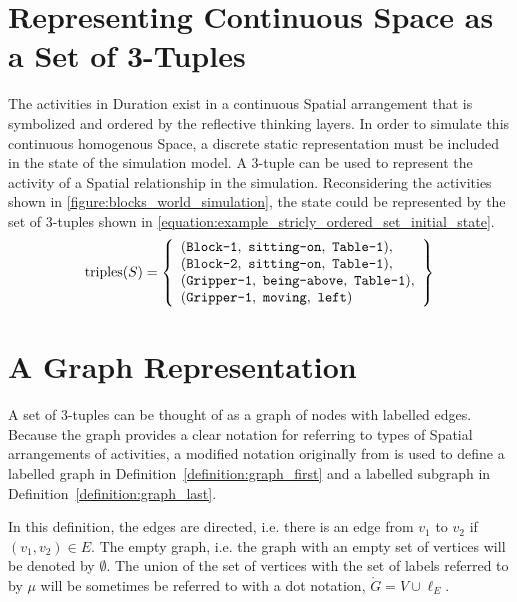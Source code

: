 \section{Representing Continuous Space as a Set of 3-Tuples}

The activities in Duration exist in a continuous Spatial arrangement
that is symbolized and ordered by the reflective thinking layers.  In
order to simulate this continuous homogenous Space, a discrete static
representation must be included in the state of the simulation model.
A 3-tuple can be used to represent the activity of a Spatial
relationship in the simulation.  Reconsidering the activities shown in
{\mbox{\autoref{figure:blocks_world_simulation}}}, the state could be
represented by the set of 3-tuples shown in
{\mbox{\autoref{equation:example_stricly_ordered_set_initial_state}}}.
\begin{equation}
\label{equation:example_stricly_ordered_set_initial_state}
\text{triples}(S) =
  \left\{
    \begin{array}{l}
      (\text{\tt{Block-1}},   ~\text{\tt{sitting-on}},  ~\text{\tt{Table-1}}), \\
      (\text{\tt{Block-2}},   ~\text{\tt{sitting-on}},  ~\text{\tt{Table-1}}), \\
      (\text{\tt{Gripper-1}}, ~\text{\tt{being-above}}, ~\text{\tt{Table-1}}), \\
      (\text{\tt{Gripper-1}}, ~\text{\tt{moving}},      ~\text{\tt{left}})
    \end{array}
  \right\}
\end{equation}

\section{A Graph Representation}

A set of 3-tuples can be thought of as a graph of nodes with labelled
edges.  Because the graph provides a clear notation for referring to
types of Spatial arrangements of activities, a modified notation
originally from {\mbox{\cite{messmer:1995}}} is used to define a
labelled graph in {\mbox{Definition~\ref{definition:graph_first}}} and
a labelled subgraph in
{\mbox{Definition~\ref{definition:graph_last}}}.

 \noindent In this definition, the edges are
directed, i.e. there is an edge from $v_1$ to $v_2$ if $(v_1,
v_2){\in}E$.  The empty graph, i.e. the graph with an empty set of
vertices will be denoted by $\emptyset$.  The union of the set of
vertices with the set of labels referred to by $\mu$ will be sometimes
be referred to with a dot notation, $\mathring{G}=V {\cup} \ell_E$.

